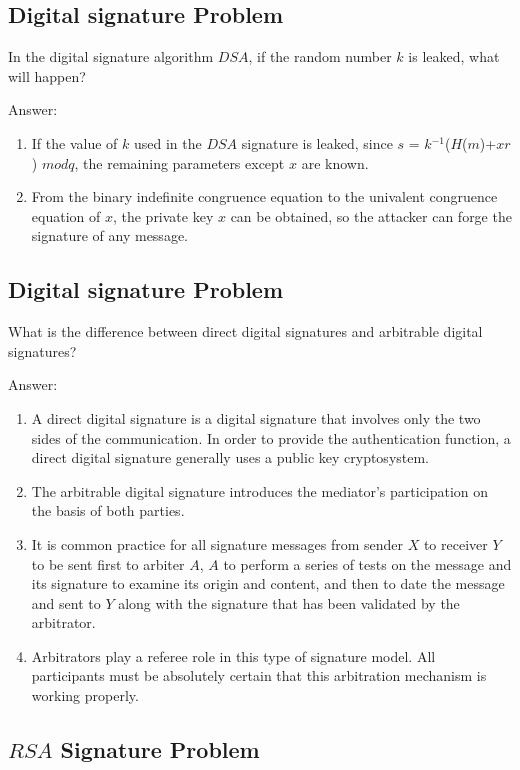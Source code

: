 \documentclass[paper=a4, fontsize=11pt]{scrartcl} %
\numberwithin{equation}{section} %
\numberwithin{figure}{section} %
\numberwithin{table}{section} %
\begin{document}
\subsection{Digital signature Problem \uppercase\expandafter{}}

In the digital signature algorithm $DSA$, if the random number $k$ is leaked, what will happen?

Answer:
\begin{enumerate}
\item If the value of $k$ used in the $DSA$ signature is leaked, since $s$ = $k$$^{-1}$($H$($m$)+$xr$) $mod q$, the remaining parameters except $x$ are known.
\item From the binary indefinite congruence equation to the univalent congruence equation of $x$, the private key $x$ can be obtained, so the attacker can forge the signature of any message.
\end{enumerate}


\subsection{Digital signature Problem \uppercase\expandafter{}}

What is the difference between direct digital signatures and arbitrable digital signatures?

Answer:
\begin{enumerate}
\item A direct digital signature is a digital signature that involves only the two sides of the communication. In order to provide the authentication function, a direct digital signature generally uses a public key
    cryptosystem.
\item The arbitrable digital signature introduces the mediator's participation on the basis of both parties.
\item It is common practice for all signature messages from sender $X$ to receiver $Y$ to be sent first to arbiter $A$, $A$ to perform a series of tests on the message and its signature to examine its origin and content, and then to date the message and sent to $Y$ along with the signature that has been validated by the arbitrator.
\item Arbitrators play a referee role in this type of signature model. All participants must be absolutely certain that this arbitration mechanism is working properly.
\end{enumerate}


\subsection{$RSA$ Signature Problem \uppercase\expandafter{}}
\end{document}
